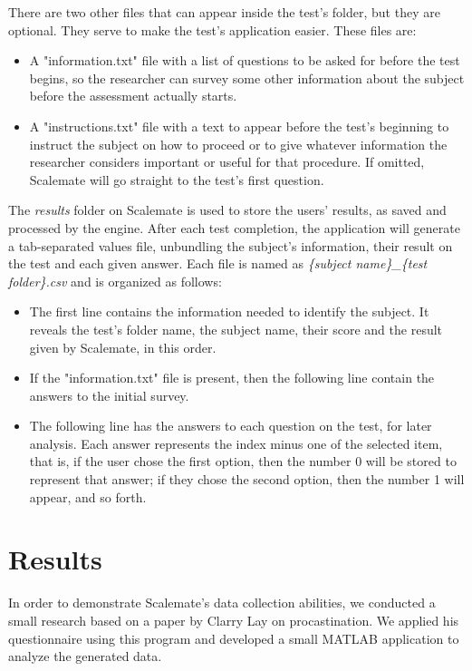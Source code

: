 \documentclass[12pt, a4paper, twoside]{article}
\begin{document}
There are two other files that can appear inside the test's folder, but they are optional. They serve to make the test's application easier. These files are:
\begin{itemize}
\item A "information.txt" file with a list of questions to be asked for before the test begins, so the researcher can survey some other information about the subject before the assessment actually starts.
\item A "instructions.txt" file with a text to appear before the test's beginning to instruct the subject on how to proceed or to give whatever information the researcher considers important or useful for that procedure. If omitted, Scalemate will go straight to the test's first question.
\end{itemize}

The \textit{results} folder on Scalemate is used to store the users' results, as saved and processed by the engine. After each test completion, the application will generate a tab-separated values file, unbundling the subject's information, their result on the test and each given answer. Each file is named as \textit{\{subject name\}\_\{test folder\}.csv} and is organized as follows:

\begin{itemize}
\item The first line contains the information needed to identify the subject. It reveals the test's folder name, the subject name, their score and the result given by Scalemate, in this order.
\item If the "information.txt" file is present, then the following line contain the answers to the initial survey.
\item The following line has the answers to each question on the test, for later analysis. Each answer represents the index minus one of the selected item, that is, if the user chose the first option, then the number 0 will be stored to represent that answer; if they chose the second option, then the number 1 will appear, and so forth.
\end{itemize}


\section{Results}

In order to demonstrate Scalemate's data collection abilities, we conducted a small research based on a paper by Clarry Lay \cite{lay86} on procastination. We applied his questionnaire using this program and developed a small MATLAB application to analyze the generated data.
\end{document}
